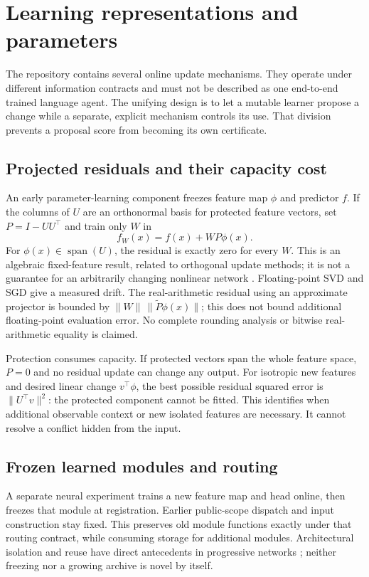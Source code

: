 \documentclass[10pt,twocolumn]{article}
\begin{document}
\section{Learning representations and parameters}\label{sec:learning}
The repository contains several online update mechanisms. They
operate under different information contracts and must not be described as
one end-to-end trained language agent. The unifying design is to let a mutable
learner propose a change while a separate, explicit mechanism controls its use.
That division prevents a proposal score from becoming its own certificate.

\subsection{Projected residuals and their capacity cost}
An early parameter-learning component freezes feature map $\phi$ and predictor
$f$. If the columns of $U$ are an orthonormal basis for protected feature
vectors, set $P=I-UU^\top$ and train only $W$ in
\begin{equation}\label{eq:residual}
 f_W(x)=f(x)+WP\phi(x).
\end{equation}
For $\phi(x)\in\operatorname{span}(U)$, the residual is exactly zero for every
$W$. This is an algebraic fixed-feature result, related to orthogonal update
methods; it is not a guarantee for an arbitrarily changing nonlinear network
\citep{farajtabar2020ogd,lopezpaz2017gem}. Floating-point SVD and SGD give a
measured drift. The real-arithmetic residual using an approximate projector
is bounded by $\|W\|\,\|\widetilde P\phi(x)\|$; this does not bound
additional floating-point evaluation error. No complete rounding analysis or
bitwise real-arithmetic equality is claimed.

Protection consumes capacity. If protected vectors span the whole feature
space, $P=0$ and no residual update can change any output. For isotropic new
features and desired linear change $v^\top\phi$, the best possible residual
squared error is $\|U^\top v\|^2$: the protected component cannot be fitted.
This identifies when additional observable context or new isolated features
are necessary. It cannot resolve a conflict hidden from the input.

\subsection{Frozen learned modules and routing}
A separate neural experiment trains a new feature map and head online, then
freezes that module at registration. Earlier public-scope dispatch and input
construction stay fixed. This preserves old module functions exactly under
that routing contract, while consuming storage for additional modules.
Architectural isolation and reuse have direct antecedents in progressive
networks \citep{rusu2016progressive}; neither freezing nor a growing archive
is novel by itself.
\end{document}
